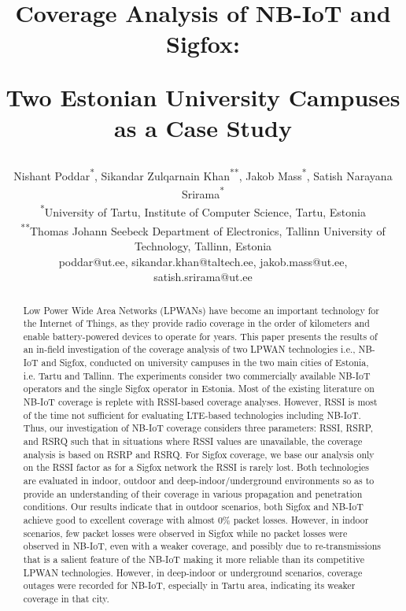\documentclass[conference,a4paper,xcolor=table]{IEEEtran}
\begin{document}
\title{Coverage Analysis of NB-IoT and Sigfox: \par Two Estonian University Campuses as a Case Study}

\author{Nishant Poddar\textsuperscript{*}, Sikandar Zulqarnain Khan\textsuperscript{**}, Jakob Mass\textsuperscript{*}, Satish Narayana Srirama\textsuperscript{*}  \\
\textsuperscript{*}University of Tartu, Institute of Computer Science, Tartu, Estonia\\
\textsuperscript{**}Thomas Johann Seebeck Department of Electronics, Tallinn University of Technology, Tallinn, Estonia\\
poddar@ut.ee, sikandar.khan@taltech.ee, jakob.mass@ut.ee, \\ satish.srirama@ut.ee}

\maketitle

\begin{abstract}
Low Power Wide Area Networks (LPWANs) have become an important technology for the Internet of Things, as they provide radio coverage in the order of kilometers and enable battery-powered devices to operate for years.
This paper presents the results of an in-field investigation of the coverage analysis of two LPWAN technologies i.e., NB-IoT and Sigfox, conducted on university campuses in the two main cities of Estonia, i.e. Tartu and Tallinn.  The experiments consider two commercially available NB-IoT operators and the single Sigfox operator in Estonia. 
Most of the existing literature on NB-IoT coverage is replete with RSSI-based coverage analyses. However, RSSI is most of the time not sufficient for evaluating LTE-based technologies including NB-IoT. Thus, our investigation of NB-IoT coverage considers three parameters: RSSI, RSRP, and RSRQ such that in situations where RSSI values are unavailable, the coverage analysis is based on RSRP and RSRQ. For Sigfox coverage, we base our analysis only on the RSSI factor as for a Sigfox network the RSSI is rarely lost. Both technologies are evaluated in indoor, outdoor and deep-indoor/underground environments so as to provide an understanding of their coverage in various propagation and penetration conditions. Our results indicate that in outdoor scenarios, both Sigfox and NB-IoT achieve good to excellent coverage with almost 0\% packet losses. However, in indoor scenarios, few packet losses were observed in Sigfox while no packet losses were observed in NB-IoT, even with a weaker coverage, and possibly due to re-transmissions that is a salient feature of the NB-IoT making it more reliable than its competitive LPWAN technologies. However, in deep-indoor or underground scenarios, coverage outages were recorded for NB-IoT, especially in Tartu area, indicating its weaker coverage in that city.
\end{abstract}
\end{document}
